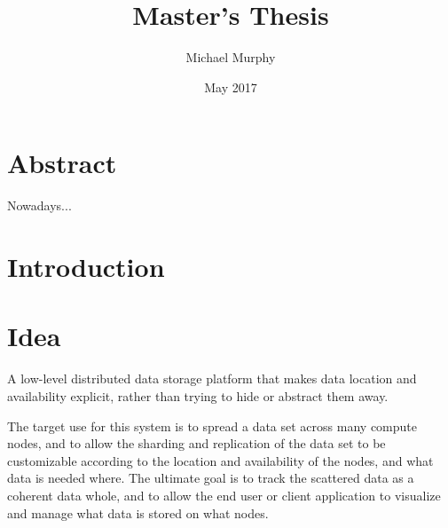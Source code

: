 \documentclass[12pt,a4paper,two-side]{book}
\begin{document}
\title{Master's Thesis}
\author{Michael Murphy}
\date{May 2017}
\maketitle

\frontmatter









\chapter{Abstract}

Nowadays...









\tableofcontents

{}

\listoffigures
{}


\lstlistoflistings
{}

\mainmatter









\chapter{Introduction}









\chapter{Idea}\label{idea}

A low-level distributed data storage platform that makes data location and
availability explicit, rather than trying to hide or abstract them away.

The target use for this system is to spread a data set across many compute
nodes, and to allow the sharding and replication of the data set to be
customizable according to the location and availability of the nodes, and what
data is needed where. The ultimate goal is to track the scattered data as a
coherent data whole, and to allow the end user or client application to
visualize and manage what data is stored on what nodes.
\end{document}
